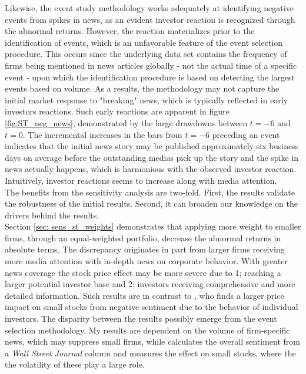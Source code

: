 Likewise, the event study methodology works adequately at identifying negative events from spikes in news, as an evident investor reaction is recognized through the abnormal returns. However, the reaction materializes prior to the identification of events, which is an unfavorable feature of the event selection procedure. This occurs since the underlying data set contains the frequency of firms being mentioned in news articles globally - not the actual time of a specific event - upon which the identification procedure is based on detecting the largest events based on volume. As a results, the methodology may not capture the initial market response to "breaking" news, which is typically reflected in early investors reactions. Such early reactions are apparent in figure \ref{fig:ST_neg_news}, demonstrated by the large drawdowns between $t = -6$ and $t = 0$. The incremental increases in the bars from $t=-6$ preceding an event indicates that the initial news story may be published approximately six business days on average before the outstanding medias pick up the story and the spike in news actually happens, which is harmonious with the observed investor reaction. Intuitively, investor reactions seems to increase along with media attention.   \\

The benefits from the sensitivity analysis are two-fold. First, the results validate the robustness of the initial results. Second, it can broaden our knowledge on the drivers behind the results. \\

Section \ref{sec: sens_st_weights} demonstrates that applying more weight to smaller firms, through an equal-weighted portfolio, decrease the abnormal returns in absolute terms. The discrepancy originates in part from larger firms receiving more media attention with in-depth news on corporate behavior. With greater news coverage the stock price effect may be more severe due to 1; reaching a larger potential investor base and 2; investors receiving comprehensive and more detailed information. Such results are in contrast to \cite{tetlock_sentiment}, who finds a larger price impact on small stocks from negative sentiment due to the behavior of individual investors. The disparity between the results possibly emerge from the event selection methodology. My results are dependent on the volume of firm-specific news, which may suppress small firms, while \citeauthor{tetlock_sentiment} calculates the overall sentiment from a \textit{Wall Street Journal} column and measures the effect on small stocks, where the the volatility of these play a large role.  

